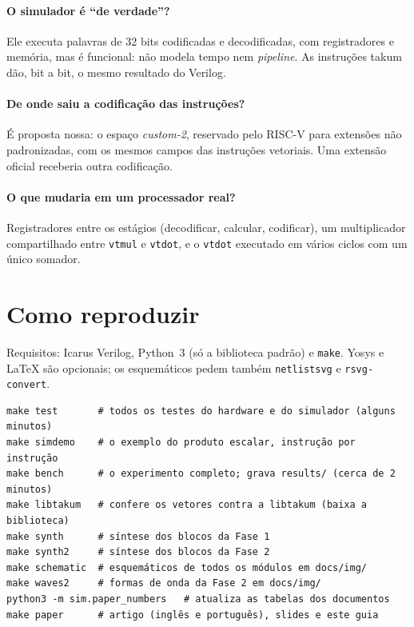 \documentclass[11pt,a4paper]{article}
\newcommand{\code}[1]{\texttt{#1}}
\begin{document}
\paragraph{O simulador é ``de verdade''?} Ele executa palavras de 32 bits codificadas e decodificadas,
com registradores e memória, mas é funcional: não modela tempo nem \emph{pipeline}. As instruções takum
dão, bit a bit, o mesmo resultado do Verilog.

\paragraph{De onde saiu a codificação das instruções?} É proposta nossa: o espaço \emph{custom-2},
reservado pelo RISC-V para extensões não padronizadas, com os mesmos campos das instruções vetoriais. Uma
extensão oficial receberia outra codificação.

\paragraph{O que mudaria em um processador real?} Registradores entre os estágios (decodificar, calcular,
codificar), um multiplicador compartilhado entre \code{vtmul} e \code{vtdot}, e o \code{vtdot} executado
em vários ciclos com um único somador.

\section{Como reproduzir}
\label{sec:repro}

Requisitos: Icarus Verilog, Python~3 (só a biblioteca padrão) e \code{make}. Yosys e \LaTeX{} são
opcionais; os esquemáticos pedem também \code{netlistsvg} e \code{rsvg-convert}.

\begin{lstlisting}
make test       # todos os testes do hardware e do simulador (alguns minutos)
make simdemo    # o exemplo do produto escalar, instrução por instrução
make bench      # o experimento completo; grava results/ (cerca de 2 minutos)
make libtakum   # confere os vetores contra a libtakum (baixa a biblioteca)
make synth      # síntese dos blocos da Fase 1
make synth2     # síntese dos blocos da Fase 2
make schematic  # esquemáticos de todos os módulos em docs/img/
make waves2     # formas de onda da Fase 2 em docs/img/
python3 -m sim.paper_numbers   # atualiza as tabelas dos documentos
make paper      # artigo (inglês e português), slides e este guia
\end{lstlisting}
\end{document}
